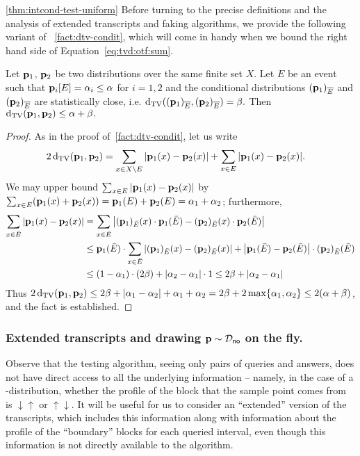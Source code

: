 \begin{proofof}{\cref{thm:intcond-test-uniform}}
Before turning to the precise definitions and the analysis of
extended transcripts and faking algorithms, we provide the following variant of
~\cref{fact:dtv-condit}, which will come in handy when we bound
 the right hand side of Equation~\eqref{eq:tvd:otf:sum}.

\begin{fact} \label{fact:dtv-condit2}
Let $\mathbf{p}_1$, $\mathbf{p}_2$ be two distributions over the same finite set $X$.  Let
$E$ be an event such that
$\mathbf{p}_i[E] = \alpha_i \leq \alpha$ for $i=1,2$ and the conditional
distributions $(\mathbf{p}_1)_{\overline{E}}$ and
$(\mathbf{p}_2)_{\overline{E}}$ are statistically close, i.e.
$\operatorname{d}_{\textrm{TV}}(
(\mathbf{p}_1)_{\overline{E}}, (\mathbf{p}_2)_{\overline{E}})= \beta.$
Then $\operatorname{d}_{\textrm{TV}}(\mathbf{p}_1,\mathbf{p}_2) \leq \alpha + \beta.$
\end{fact}

\begin{proof}
As in the proof of~\cref{fact:dtv-condit}, let us write
\begin{align*}
2\operatorname{d}_{\textrm{TV}}(\mathbf{p}_1,\mathbf{p}_2)
&= \sum_{x \in X \setminus E} |\mathbf{p}_1(x)-\mathbf{p}_2(x)| + \sum_{x \in  E} |\mathbf{p}_1(x)-\mathbf{p}_2(x)|.
\end{align*}
We may upper bound
$\sum_{x \in  E} |\mathbf{p}_1(x)-\mathbf{p}_2(x)|$ by
$\sum_{x \in  E} (\mathbf{p}_1(x) + \mathbf{p}_2(x)) =
\mathbf{p}_1(E) + \mathbf{p}_2(E) = \alpha_1+\alpha_2$; furthermore,
\begin{align*}
  \sum_{x \in \bar{E}} |\mathbf{p}_1(x)-\mathbf{p}_2(x)|
&= \sum_{x \in \bar{E}} \left\lvert  (\mathbf{p}_1)_{\bar{E}}(x)\cdot\mathbf{p}_1(\bar{E}) - (\mathbf{p}_2)_{\bar{E}}(x)\cdot\mathbf{p}_2(\bar{E})  \right\rvert\\
&\leq \mathbf{p}_1(\bar{E})\cdot \sum_{x \in \bar{E}} \left\lvert  (\mathbf{p}_1)_{\bar{E}}(x) - (\mathbf{p}_2)_{\bar{E}}(x)  \right\rvert + \left\lvert \mathbf{p}_1(\bar{E})-\mathbf{p}_2(\bar{E}) \right\rvert\cdot(\mathbf{p}_2)_{\bar{E}}(\bar{E})\\
&\leq (1-\alpha_1)\cdot (2\beta) + \left\lvert \alpha_2-\alpha_1 \right\rvert\cdot 1 \leq 2\beta + \left\lvert \alpha_2-\alpha_1 \right\rvert
\end{align*}
Thus $2 \operatorname{d}_{\textrm{TV}}(\mathbf{p}_1,\mathbf{p}_2) \leq 2\beta + |\alpha_1 - \alpha_2| + \alpha_1 + \alpha_2 =
2\beta + 2 \max\{\alpha_1,\alpha_2\} \leq 2 (\alpha + \beta)$, and the fact is established.
\end{proof}


\subsubsection{Extended transcripts and drawing \texorpdfstring{$\mathbf{p} \sim \mathcal{D}_{\textsf{no}}$}{a no-distribution $\D$} on the fly.} \label{sssec:onthefly}
Observe that the testing algorithm, seeing only pairs of queries and answers,
does not have direct access to all the underlying information -- namely,
in the case of a \no-distribution,
whether the profile of the block that the sample point comes from
is $\downarrow \uparrow$ or $\uparrow \downarrow$. It will be 
useful for us to consider an ``extended'' version of the transcripts,
which includes this information along with information about the
profile of the ``boundary'' blocks for each queried interval,
even though this information is not directly available to the
algorithm.


\end{proofof}
